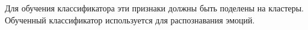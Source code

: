 Для обучения классификатора эти признаки должны быть поделены на кластеры. Обученный классификатор используется для распознавания эмоций.
